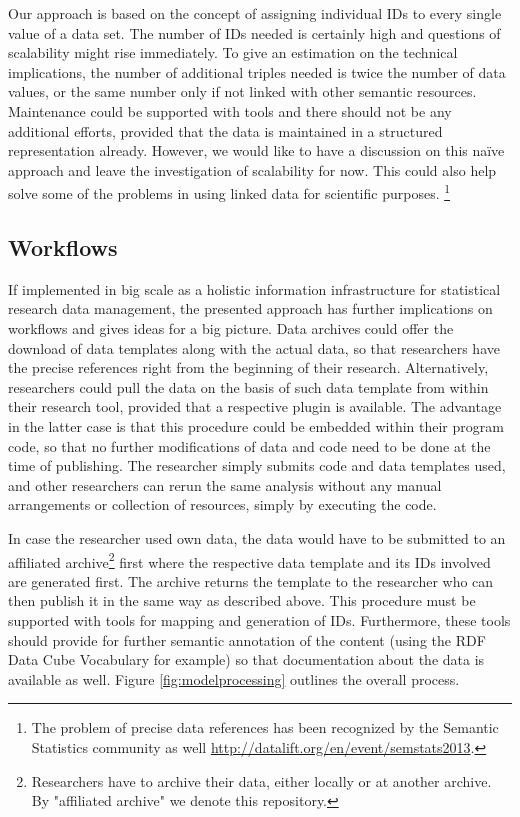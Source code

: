 \documentclass{acm_proc_article-sp}
\begin{document}
Our approach is based on the concept of assigning individual IDs to every single value of a data set.
The number of IDs needed is certainly high and questions of scalability might rise immediately.
To give an estimation on the technical implications, the number of additional triples needed is twice the number of data values, or the same number only if not linked with other semantic resources.
Maintenance could be supported with tools and there should not be any additional efforts, provided that the data is maintained in a structured representation already.
However, we would like to have a discussion on this naïve approach and leave the investigation of scalability for now.
This could also help solve some of the problems in using linked data for scientific purposes. \cite{bechhofer2010linked}\footnote{The problem of precise data references has been recognized by the Semantic Statistics community as well \url{http://datalift.org/en/event/semstats2013}.}



\subsection{Workflows}


If implemented in big scale as a holistic information infrastructure for statistical research data management, the presented approach has further implications on workflows and gives ideas for a big picture.
Data archives could offer the download of data templates along with the actual data, so that researchers have the precise references right from the beginning of their research.
Alternatively, researchers could pull the data on the basis of such data template from within their research tool, provided that a respective plugin is available.
The advantage in the latter case is that this procedure could be embedded within their program code, so that no further modifications of data and code need to be done at the time of publishing.
The researcher simply submits code and data templates used, and other researchers can rerun the same analysis without any manual arrangements or collection of resources, simply by executing the code.


In case the researcher used own data, the data would have to be submitted to an affiliated archive\footnote{Researchers have to archive their data, either locally or at another archive. By "affiliated archive" we denote this repository.} first where the respective data template and its IDs involved are generated first.
The archive returns the template to the researcher who can then publish it in the same way as described above.
This procedure must be supported with tools for mapping and generation of IDs.
Furthermore, these tools should provide for further semantic annotation of the content (using the RDF Data Cube Vocabulary for example) so that documentation about the data is available as well.
Figure \ref{fig:modelprocessing} outlines the overall process.
\end{document}
